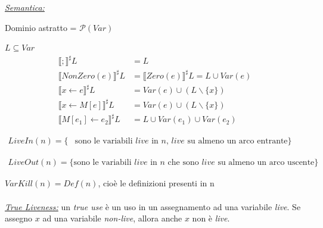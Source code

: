\documentclass{article}
\begin{document}
                \noindent
                \underline{\textit{Semantica:}}

                Dominio astratto = $\mathcal{P}(Var)$

                $L\subseteq Var$
                \begin{align*}
                    \llbracket ; \rrbracket^\sharp L &= L\\
                    \llbracket NonZero(e) \rrbracket^\sharp L &= \llbracket Zero(e) \rrbracket^\sharp L = L \cup Var(e)\\
                    \llbracket x\leftarrow e \rrbracket^\sharp L &= Var(e) \cup (L\backslash\{x\})\\
                    \llbracket x\leftarrow M[e] \rrbracket^\sharp L &= Var(e) \cup (L\backslash\{x\})\\
                    \llbracket M[e_1]\leftarrow e_2 \rrbracket^\sharp L &= L \cup Var(e_1) \cup Var(e_2)
                \end{align*}

                $\begin{aligned}
                    LiveIn(n) = \{ &\text{sono le variabili } \textit{live} \text{ in } n \text{, } \textit{live} \text{ su almeno un arco entrante\}}
                \end{aligned}$

                $\begin{aligned}
                    LiveOut(n) = \{\text{sono le variabili } \textit{live} \text{ in } n \text{ che sono } \textit{live} \text{ su almeno un arco uscente}\}
                \end{aligned}$

                $VarKill(n) = Def(n)$, cioè le definizioni presenti in n\\
                \\
                \underline{\textit{True Liveness:}} un \textit{true use} è un uso in un assegnamento ad una variabile \textit{live}. Se assegno $x$ ad una variabile \textit{non-live}, allora anche $x$ non è \textit{live}.
\end{document}
